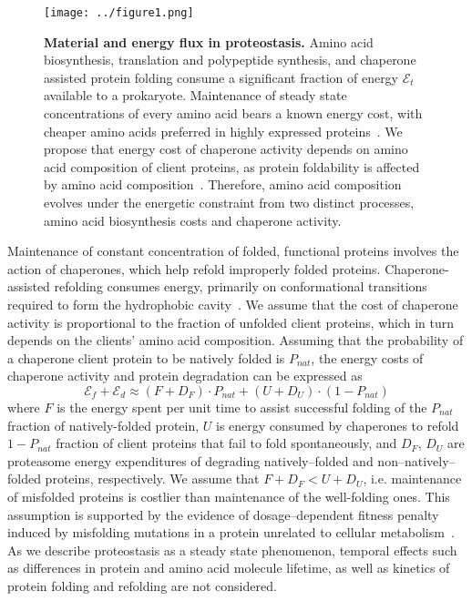 \documentclass[10pt,letterpaper]{article}
\begin{document}
\begin{figure}[h!]
\texttt{[image: ../figure1.png]}
\caption{
{\bf Material and energy flux in proteostasis.}  Amino acid biosynthesis, translation and polypeptide synthesis, and chaperone assisted protein folding consume a significant fraction of energy $\mathcal{E}_{t}$ available to a prokaryote. Maintenance of steady state concentrations of every amino acid bears a known energy cost, with cheaper amino acids preferred in highly expressed proteins~\cite{Akashi2002Metabolic}. We propose that energy cost of chaperone activity depends on amino acid composition of client proteins, as protein foldability is affected by amino acid composition~\cite{Dill1985Theory,Berezovsky2007Positive,Venev2015Massively}. Therefore, amino acid composition evolves under the energetic constraint from two distinct processes, amino acid biosynthesis costs and chaperone activity.
}
\label{fig:fig1}
\end{figure}


Maintenance of constant concentration of folded, functional proteins involves the action of chaperones, which help refold improperly folded proteins. Chaperone-assisted refolding consumes energy, primarily on conformational transitions required to form the hydrophobic cavity~\cite{Hartl2011Molecular}. We assume that the cost of chaperone activity is proportional to the fraction of unfolded client proteins, which in turn depends on the clients' amino acid composition. Assuming that the probability of a chaperone client protein to be natively folded is $P_{nat}$, the energy costs of chaperone activity and protein degradation can be expressed as 
\begin{equation}
	\label{chaperone_degradation_cost}
	\mathcal{E}_{f} + \mathcal{E}_{d} \approx (F+D_{F})\cdot P_{nat} + (U+D_{U})\cdot\left(1-P_{nat}\right)
\end{equation}
where $F$ is the energy spent per unit time to assist successful folding of the $P_{nat}$ fraction of natively-folded protein, $U$ is energy consumed by chaperones to refold $1-P_{nat}$ fraction of client proteins that fail to fold spontaneously, and $D_F$, $D_U$ are proteasome energy expenditures of degrading natively--folded and non--natively--folded proteins, respectively. We assume that $F+D_{F}<U+D_{U}$, i.e. maintenance of misfolded proteins is costlier than maintenance of the well-folding ones. This assumption is supported by the evidence of dosage--dependent fitness penalty induced by misfolding mutations in a protein unrelated to cellular metabolism~\cite{Samerotte2011Misfolded}. As we describe proteostasis as a steady state phenomenon, temporal effects such as differences in protein and amino acid molecule lifetime, as well as kinetics of protein folding and refolding are not considered.
\end{document}
